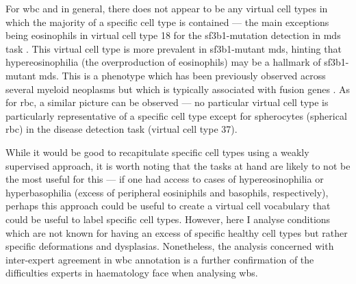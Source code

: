 For \ac{wbc} and in general, there does not appear to be any virtual cell types in which the majority of a specific cell type is contained --- the main exceptions being eosinophils in virtual cell type 18 for the \ac{sf3b1}-mutation detection in \ac{mds} task . This virtual cell type is more prevalent in \ac{sf3b1}-mutant \ac{mds}, hinting that hypereosinophilia (the overproduction of eosinophils) may be a hallmark of \ac{sf3b1}-mutant \ac{mds}. This is a phenotype which has been previously observed across several myeloid neoplasms but which is typically associated with fusion genes \cite{Reiter2017-pj}. As for \ac{rbc}, a similar picture can be observed --- no particular virtual cell type is particularly representative of a specific cell type except for spherocytes (spherical \ac{rbc}) in the disease detection task (virtual cell type 37). 

\begin{figure}[!ht]
    \label{fig:mile-vice-annotated-cells-wbc}
\end{figure}

\begin{figure}[!ht]
    \label{fig:mile-vice-annotated-cells-rbc}
\end{figure}

While it would be good to recapitulate specific cell types using a weakly supervised approach, it is worth noting that the tasks at hand are likely to not be the most useful for this --- if one had access to cases of hypereosinophilia or hyperbasophilia (excess of peripheral eosiniphils and basophils, respectively), perhaps this approach could be useful to create a virtual cell vocabulary that could be useful to label specific cell types. However, here I analyse conditions which are not known for having an excess of specific healthy cell types but rather specific deformations and dysplasias. Nonetheless, the analysis concerned with inter-expert agreement in \ac{wbc} annotation is a further confirmation of the difficulties experts in haematology face when analysing \ac{wbs}.

